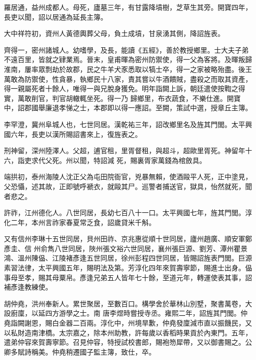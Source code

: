 \begin{pinyinscope}
 羅居通，益州成都人。母死，廬墓三年，有甘露降墳樹，芝草生其旁。開寶四年，長吏以聞，詔以居通為延長主簿。



 大中祥符初，資州人黃德輿葬父母，負土成墳，甘泉湧其側，降詔旌表。



 齊得一，密州諸城人。幼嗜學，及長，能讀《五經》，善於教授鄉里。士大夫子弟不遠百里，皆就之肄業焉。晉末，皇甫暉為密州防禦使，得一父為客將。及暉叛歸淮南，屢率眾剽劫於故郡，民之牛羊犬豕悉取以犒士卒，得一之家被略殆盡。後王萬敢為防禦使，性貪暴，執鄉民十八家，責其嘗以牛酒饋賊，盡殺之而取其資產，得一親屬死者十餘人，唯得一與兄脫身獲免。明年詣闕上訴，朝廷遣使按鞫之得實，萬敢削官，判官胡轍輒坐死。得一乃
 歸鄉里，布衣蔬食，不樂仕進。開寶中，詔郡國舉廉退孝悌之士，本郡即以得一應詔。至闕，策試中選，授章丘主簿。



 李罕澄，冀州阜城人也，七世同居。漢乾祐三年，詔改鄉里名及旌其門閭。太平興國六年，長吏以漢所賜詔書來上，復旌表之。



 刑神留，深州陸澤人。父超，逋官租，里胥督租，與超斗，超歐里胥死。神留年十六，詣吏求代父死。州以聞，特詔減
 死，賜裏胥家萬錢為棺斂具。



 端拱初，泰州海陵人沈正父為屯田院衙官，兇暴無賴，使酒毆平人死，正中塗見，父恐懾，述其故，正即號呼褫衣，就毆其尸。巡警者捕送官，獄具，怡然就死，聞者悲之。



 許祚，江州德化人。八世同居，長幼七百八十一口。太平興國七年，旌其門閭。淳化二年，本州言祚家春夏常乏食，詔歲貸米千斛。



 又有信州李琳十五世同居，貝州田祚、京兆惠從順十世同居，廬州趙廣、順安軍鄭彥圭、信
 州俞雋八世同居，陜州張文裕六世同居，襄州張巨源、劉芳、潭州瞿景鴻、溫州陳偘、江陵褚彥逢五世同居，徐州彭程四世同居，皆賜詔旌表門閭。巨源素習法律，太平興國五年，賜明法及第。芳淳化四年來賀壽寧節，賜進士出身。偘事母至孝，賜其母粟帛。彥逢兄弟五人皆年七十餘，至道元年，轉運使表其事，詔補彥逢教練使。



 胡仲堯，洪州奉新人。累世聚居，至數百口。構學舍於華林山別墅，聚書萬卷，大設廚廩，以延四方游學之士。南
 唐李煜時嘗授寺丞。雍熙二年，詔旌其門閭。仲堯詣闕謝恩，賜白金器二百兩。淳化中，州境旱歉，仲堯發廩減市直以振饑民，又以私財造南津橋。太宗嘉之，除本州助教，許每歲以香稻時果貢於內東門。五年，遣弟仲容來賀壽寧節。召見仲容，特授試校書郎，賜袍笏犀帶，又以御書賜之。公卿多賦詩稱美。仲堯稍遷國子監主簿，致仕，卒。




\end{pinyinscope}
